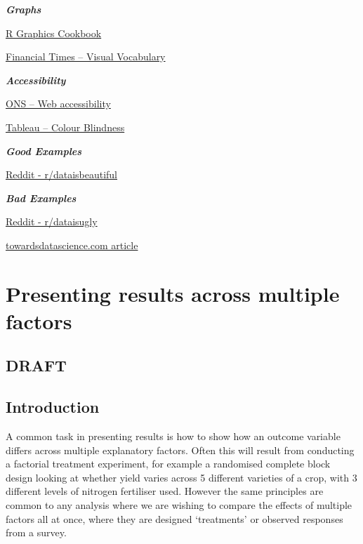 \documentclass[
]{book}
\begin{document}
\textbf{\emph{Graphs}}

\href{https://r-graphics.org/}{R Graphics Cookbook}

\href{https://github.com/ft-interactive/chart-doctor/blob/master/visual-vocabulary/Visual-vocabulary.pdf}{Financial Times -- Visual Vocabulary}

\textbf{\emph{Accessibility}}

\href{https://style.ons.gov.uk/writing-for-the-web/web-accessibility/introduction-3/}{ONS -- Web accessibility}

\href{https://www.tableau.com/about/blog/2016/4/examining-data-viz-rules-dont-use-red-green-together-53463}{Tableau -- Colour Blindness}

\textbf{\emph{Good Examples}}

\href{https://www.reddit.com/r/dataisbeautiful/}{Reddit - r/dataisbeautiful}

\textbf{\emph{Bad Examples}}

\href{https://www.reddit.com/r/dataisugly/}{Reddit - r/dataisugly}

\href{https://towardsdatascience.com/why-is-this-chart-bad-5f16da298afa}{towardsdatascience.com article}

\hypertarget{factor}{%
\chapter{Presenting results across multiple factors}\label{factor}}

\hypertarget{draft-1}{%
\section{DRAFT}\label{draft-1}}

\hypertarget{introduction-1}{%
\section{Introduction}\label{introduction-1}}

A common task in presenting results is how to show how an outcome variable differs across multiple explanatory factors. Often this will result from conducting a factorial treatment experiment, for example a randomised complete block design looking at whether yield varies across 5 different varieties of a crop, with 3 different levels of nitrogen fertiliser used. However the same principles are common to any analysis where we are wishing to compare the effects of multiple factors all at once, where they are designed `treatments' or observed responses from a survey.
\end{document}

